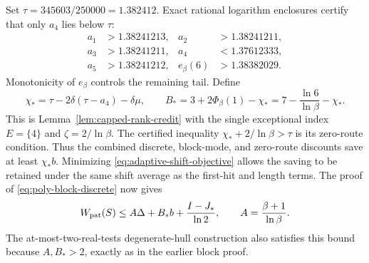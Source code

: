 Set $\tau=345603/250000=1.382412$. Exact rational logarithm
enclosures certify that only $a_4$ lies below $\tau$:
\[
 \begin{aligned}
 a_1&>1.38241213,& a_2&>1.38241211,\\
 a_3&>1.38241211,& a_4&<1.37612333,\\
 a_5&>1.38241212,& e_\beta(6)&>1.38382029.
 \end{aligned}
\]
Monotonicity of $e_\beta$ controls the remaining tail. Define
\begin{equation}\label{eq:adaptive-chi-B}
 \chi_* =\tau-2\delta(\tau-a_4)-\delta\mu,\qquad
 B_* =3+2\Phi_\beta(1)-\chi_*
      =7-\frac{\ln6}{\ln\beta}-\chi_*.
\end{equation}
This is Lemma~\ref{lem:capped-rank-credit} with the single
exceptional index $E=\{4\}$ and $\zeta=2/\ln\beta$.
The certified inequality $\chi_*+2/\ln\beta>\tau$ is its
zero-route condition. Thus the combined discrete, block-mode, and
zero-route discounts save at least $\chi_*b$.
Minimizing \eqref{eq:adaptive-shift-objective} allows the saving to
be retained under the same shift average as the first-hit and length
terms. The proof of \eqref{eq:poly-block-discrete} now gives
\begin{equation}\label{eq:adaptive-local}
 W_{\rm pat}(S)\le A\Delta+B_*b+\frac{I-J_*}{\ln2},
 \qquad A=\frac{\beta+1}{\ln\beta}.
\end{equation}
The at-most-two-real-tests degenerate-hull construction also satisfies
this bound because $A,B_*>2$, exactly as in the earlier block proof.

